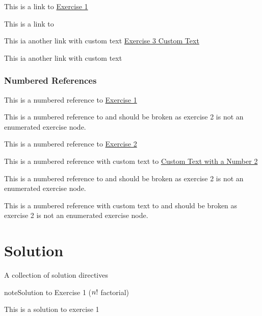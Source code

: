\sphinxAtStartPar
This is a link to \hyperref[exercise:exercise-1]{Exercise 1}

\sphinxAtStartPar
This is a link to {\hyperref[\detokenize{exercise:exercise-2}]{}}

\sphinxAtStartPar
This ia another link with custom text \hyperref[exercise:exercise-3]{Exercise 3 Custom Text}

\sphinxAtStartPar
This ia another link with custom text {\hyperref[\detokenize{exercise:exercise-4}]{}}


\subsection{Numbered References}
\label{\detokenize{exercise:numbered-references}}
\sphinxAtStartPar
This is a numbered reference to \hyperref[exercise:exercise-1]{Exercise 1}

\sphinxAtStartPar
This is a numbered reference to  and should be broken as exercise 2 is not an
enumerated exercise node.

\sphinxAtStartPar
This is a numbered reference to \hyperref[exercise:exercise-3]{Exercise 2}

\sphinxAtStartPar
This is a numbered reference with custom text to \hyperref[exercise:exercise-3]{Custom Text with a Number 2}

\sphinxAtStartPar
This is a numbered reference to  and should be broken as exercise 2 is not an
enumerated exercise node.

\sphinxAtStartPar
This is a numbered reference with custom text to  and should be broken as exercise 2 is not an
enumerated exercise node.

\sphinxstepscope


\chapter{Solution}
\label{\detokenize{solution:solution}}\label{\detokenize{solution::doc}}
\sphinxAtStartPar
A collection of solution directives
 \label{solution:solution-1}

\begin{sphinxadmonition}{note}{Solution to Exercise 1 (\protect\(n!\protect\) factorial)}



\sphinxAtStartPar
This is a solution to exercise 1
\end{sphinxadmonition}
 \label{solution:solution-2}

